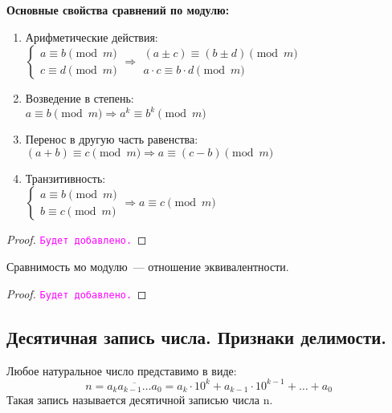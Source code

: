 \documentclass[11pt]{article}
\begin{document}
\textbf{Основные свойства сравнений по модулю:}
\begin{enumerate}
	\item Арифметические действия:\\
	$\begin{cases}
	a \equiv b \pmod m \\
	c \equiv d \pmod m
	\end{cases} \Longrightarrow \left . \begin{array}{l}(a \pm c) \equiv (b \pm d) \pmod m \\ a \cdot c \equiv b \cdot d \pmod m \end{array} \right .$
	\item Возведение в степень:\\
	$a \equiv b \pmod m \Longrightarrow a^k \equiv b^k \pmod m$
	\item
	Перенос в другую часть равенства:\\
	$(a + b) \equiv c \pmod m \Longrightarrow a \equiv (c - b) \pmod m$
	\item Транзитивность:\\
	$\begin{cases} a \equiv b \pmod m \\ b \equiv c \pmod m\end{cases} \Longrightarrow a \equiv c \pmod m$
\end{enumerate}
\begin{proof}

	\textcolor{magenta}{\texttt{Будет добавлено.}}

\end{proof}

\begin{statement}

    Сравнимость мо модулю~--- отношение эквивалентности.

\end{statement}
\begin{proof}

    \textcolor{magenta}{\texttt{Будет добавлено.}}

\end{proof}

\subsection{Десятичная запись числа. Признаки делимости.}

\begin{definition}
    Любое натуральное число представимо в виде:
\[ n = \overline{a_{k}a_{k - 1}\ldots a_0} = a_k \cdot 10^k + a_{k - 1} \cdot 10^{k -1} + \ldots + a_0 \]
Такая запись называется десятичной записью числа n.
\end{definition}
\end{document}
